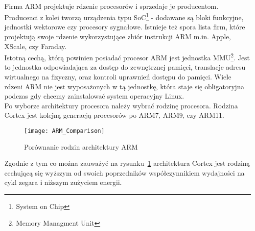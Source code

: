 \\
Firma ARM projektuje rdzenie procesorów i sprzedaje je producentom. Producenci z kolei tworzą urządzenia typu SoC\footnote{System on Chip} - dodawane są bloki funkcyjne, jednostki wektorowe czy procesory sygnałowe. Istnieje też spora lista firm, które projektują swoje rdzenie wykorzystujące zbiór instrukcji ARM m.in. Apple, XScale, czy Faraday.
\\
Istotną cechą, którą powinien posiadać procesor ARM jest jednostka MMU\footnote{Memory Managment Unit}. Jest to jednostka odpowiadająca za dostęp do zewnętrznej pamięci, translacje adresu wirtualnego na fizyczny, oraz kontroli uprawnień dostępu do pamięci. Wiele rdzeni ARM nie jest wyposażonych w tą jednostkę, która staje się obligatoryjna podczas gdy chcemy zainstalować system operacyjny Linux. 
\\

Po wyborze architektury procesora należy wybrać rodzinę procesora. Rodzina Cortex jest kolejną generacją procesorów po ARM7, ARM9, czy ARM11.

\begin{figure}
\begin{center}
	\texttt{[image: ARM\_Comparison]}
\end{center}
\caption{Porównanie rodzin architektury ARM}
\label{fig:ARM_Comp}
\end{figure}

Zgodnie z tym co można zauważyć na rysunku~\ref{fig:ARM_Comp} architektura Cortex jest rodziną cechującą się wyższym od swoich poprzedników współczynnikiem wydajności na cykl zegara i niższym zużyciem energii.

